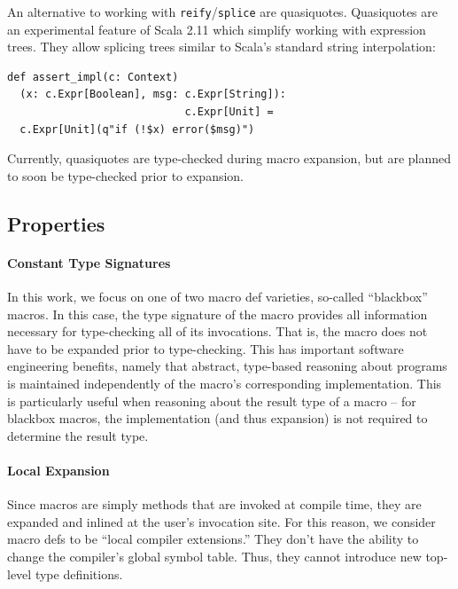 \documentclass[preprint]{sigplanconf}
\begin{document}
An alternative to working with \verb|reify|/\verb|splice| are quasiquotes.
Quasiquotes are an experimental feature of Scala 2.11 which simplify working
with expression trees. They allow splicing trees similar to Scala's standard
string interpolation:
\begin{lstlisting}
def assert_impl(c: Context)
  (x: c.Expr[Boolean], msg: c.Expr[String]):
                            c.Expr[Unit] =
  c.Expr[Unit](q"if (!$x) error($msg)")
\end{lstlisting}
\noindent
Currently, quasiquotes are type-checked during macro expansion, but are
planned to soon be type-checked prior to expansion.


\subsection{Properties}

\paragraph{Constant Type Signatures} In this work, we focus on one of two macro def
varieties, so-called ``blackbox'' macros. In this case, the type signature of
the macro provides all information necessary for type-checking all of its
invocations. That is, the macro does not have to be expanded prior to type-checking.
This has important software engineering benefits, namely that
abstract, type-based reasoning about programs is maintained independently of
the macro's corresponding implementation. This is particularly useful when
reasoning about the result type of a macro -- for blackbox macros, the
implementation (and thus expansion) is not required to determine the result
type.

\paragraph{Local Expansion} Since macros are simply methods that are invoked
at compile time, they are expanded and inlined at the user's invocation site.
For this reason, we consider macro defs to be ``local compiler extensions.''
They don't have the ability to change the compiler's global symbol table.
Thus, they cannot introduce new top-level type definitions.

\end{document}
